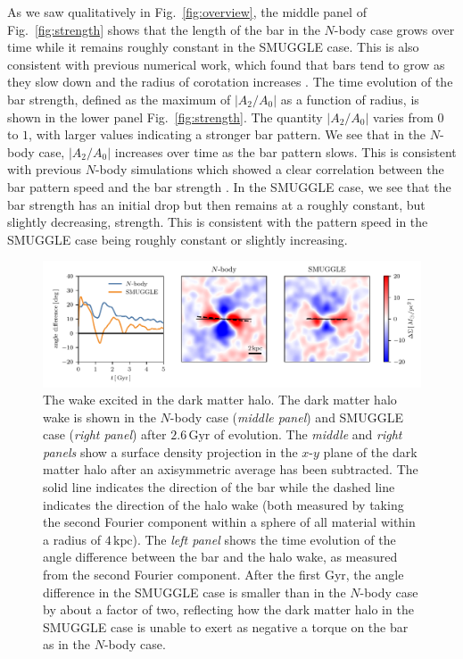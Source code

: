 \documentclass[fleqn,usenatbib]{mnras}
\newcommand{\Nbody}{$N$-body}
\begin{document}
As we saw qualitatively in Fig.~\ref{fig:overview}, the middle panel of
Fig.~\ref{fig:strength} shows that the length of the bar in the \Nbody{} case
grows over time while it remains roughly constant in the SMUGGLE case. This is
also consistent with previous numerical work, which found that bars tend to grow
as they slow down and the radius of corotation increases
\citep{2000ApJ...543..704D, 2003MNRAS.341.1179A}. The time evolution of the bar
strength, defined as the maximum of $\left|A_2/A_0\right|$ as a function of
radius, is shown in the lower panel Fig.~\ref{fig:strength}. The quantity
$\left|A_2/A_0\right|$ varies from $0$ to $1$, with larger values indicating a
stronger bar pattern. We see that in the \Nbody{} case, $\left|A_2/A_0\right|$
increases over time as the bar pattern slows. This is consistent with previous
\Nbody{} simulations which showed a clear correlation between the bar pattern
speed and the bar strength \citep[e.g.,][]{2003MNRAS.341.1179A}. In the SMUGGLE
case, we see that the bar strength has an initial drop but then remains at a
roughly constant, but slightly decreasing, strength. This is consistent with the
pattern speed in the SMUGGLE case being roughly constant or slightly increasing.

\begin{figure}
    \centering
    \includegraphics[width=18cm]{fig/halo_wake.pdf}
    \caption{The wake excited in the dark matter halo. The dark matter halo wake
    is shown in the \Nbody{} case (\textit{middle panel}) and SMUGGLE case
    (\textit{right panel}) after $2.6\,\textrm{Gyr}$ of evolution. The
    \textit{middle} and \textit{right panels} show a surface density projection
    in the $x$-$y$ plane of the dark matter halo after an axisymmetric average
    has been subtracted. The solid line indicates the direction of the bar while
    the dashed line indicates the direction of the halo wake (both measured by
    taking the second Fourier component within a sphere of all material within a
    radius of $4\,\textrm{kpc}$). The \textit{left panel} shows the time
    evolution of the angle difference between the bar and the halo wake, as
    measured from the second Fourier component. After the first Gyr, the angle
    difference in the SMUGGLE case is smaller than in the \Nbody{} case by about
    a factor of two, reflecting how the dark matter halo in the SMUGGLE case is
    unable to exert as negative a torque on the bar as in the \Nbody{} case.}
    \label{fig:wake}
\end{figure}
\end{document}
